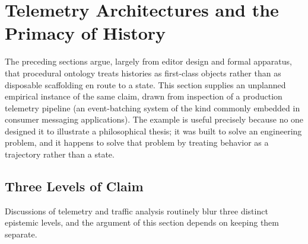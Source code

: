 \documentclass[12pt,a4paper]{article}
\theoremstyle{plain}
\theoremstyle{definition}
\theoremstyle{remark}
\begin{document}
\section{Telemetry Architectures and the Primacy of History}
\label{sec:telemetry-history}

The preceding sections argue, largely from editor design and formal apparatus, that procedural ontology treats histories as first-class objects rather than as disposable scaffolding en route to a state. This section supplies an unplanned empirical instance of the same claim, drawn from inspection of a production telemetry pipeline (an event-batching system of the kind commonly embedded in consumer messaging applications). The example is useful precisely because no one designed it to illustrate a philosophical thesis; it was built to solve an engineering problem, and it happens to solve that problem by treating behavior as a trajectory rather than a state.

\subsection{Three Levels of Claim}
\label{subsec:telemetry-levels}

Discussions of telemetry and traffic analysis routinely blur three distinct epistemic levels, and the argument of this section depends on keeping them separate.
\end{document}
